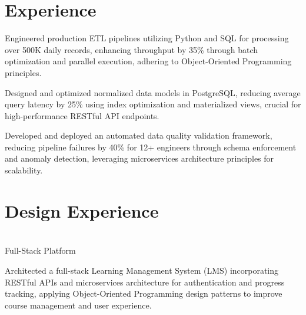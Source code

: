 \documentclass[letterpaper]{deedy-resume}
\begin{document}
\hfill
\begin{minipage}[t]{0.66\textwidth} 

\section{Experience}

\vspace{\topsep} 
\begin{tightitemize}
    
    \item Engineered production ETL pipelines utilizing Python and SQL for processing over 500K daily records, enhancing throughput by 35\% through batch optimization and parallel execution, adhering to Object-Oriented Programming principles.
    
    \item Designed and optimized normalized data models in PostgreSQL, reducing average query latency by 25\% using index optimization and materialized views, crucial for high-performance RESTful API endpoints.
    
    \item Developed and deployed an automated data quality validation framework, reducing pipeline failures by 40\% for 12+ engineers through schema enforcement and anomaly detection, leveraging microservices architecture principles for scalability.
    
\end{tightitemize}
\sectionspace 


\section{Design Experience}

 \\
Full-Stack Platform
\begin{tightitemize}
    
    \item Architected a full-stack Learning Management System (LMS) incorporating RESTful APIs and microservices architecture for authentication and progress tracking, applying Object-Oriented Programming design patterns to improve course management and user experience.
    
\end{tightitemize}
\sectionspace 


\end{minipage}
\end{document}
